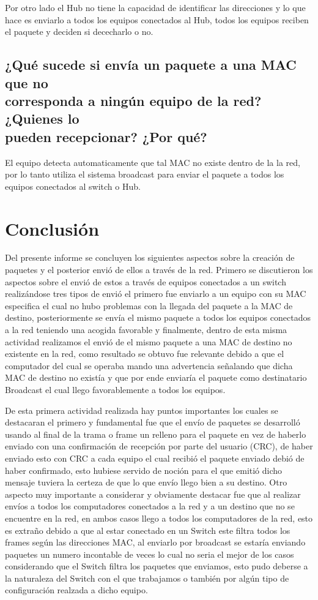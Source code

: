 \documentclass[spanish]{udpreport}
\begin{document}
Por otro lado el Hub no tiene la capacidad de identificar las direcciones y lo que hace es enviarlo a todos los equipos conectados al Hub, todos los equipos reciben el paquete y deciden si dececharlo o no.

\section{¿Qué sucede si envía un paquete a una MAC que no\\ corresponda a ningún equipo de la red? ¿Quienes lo\\ pueden recepcionar? ¿Por qué?}
El equipo detecta automaticamente que tal MAC no existe dentro de la la red, por lo tanto utiliza el sistema broadcast para enviar el paquete a todos los equipos conectados al switch o Hub.
\chapter{Conclusión}

Del presente informe se concluyen los siguientes aspectos sobre la creación de paquetes y el posterior envió de ellos a través de la red. Primero se discutieron los aspectos sobre el envió de estos a través de equipos conectados a un switch realizándose tres tipos de envió el primero fue enviarlo a un equipo con su MAC especifica el cual no hubo problemas con la llegada del paquete a la MAC de destino, posteriormente se envía el mismo paquete a todos los equipos conectados a la red teniendo una acogida favorable y finalmente, dentro de esta misma actividad realizamos el envió de el mismo paquete a una MAC de destino no existente en la red, como resultado se obtuvo  fue relevante debido a que el computador del cual se operaba mando una advertencia señalando que dicha MAC de destino no existía y que por ende enviaría el paquete como destinatario Broadcast el cual llego favorablemente a todos los equipos.

 De esta primera actividad realizada hay puntos importantes los cuales se destacaran el primero y fundamental fue que el envío de paquetes se desarrolló usando al final de la trama o frame un relleno para el paquete en vez de haberlo enviado con una confirmación de recepción por parte del usuario (CRC), de haber enviado esto con CRC a cada equipo el cual recibió el paquete enviado debió de haber confirmado, esto hubiese servido de noción para el que emitió dicho mensaje tuviera la certeza de que lo que envío llego bien a su destino. 
Otro aspecto muy importante a considerar y obviamente destacar fue que al realizar envíos a todos los computadores conectados a la red  y a un destino que no se encuentre en la red, en ambos casos llego a todos los computadores de la red, esto es extraño debido a que   al estar conectado en un Switch este filtra todos los frames según las direcciones MAC, al enviarlo por broadcast se estaría enviando paquetes un numero incontable de veces lo cual no seria el mejor de los casos considerando que el Switch filtra los paquetes que enviamos, esto pudo deberse a la naturaleza del Switch con el que trabajamos o también por algún tipo de configuración realzada a dicho equipo.
\end{document}
